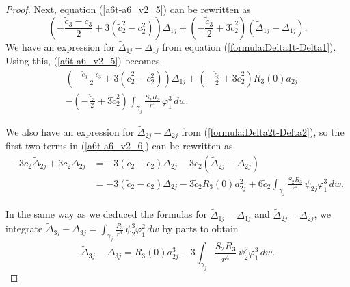 \begin{proof}
Next, equation (\ref{a6t-a6_v2_5}) can be rewritten as
\[ \left(-\frac{\tilde{c}_3-c_3}{2}+3(\tilde{c}_2^2-c_2^2)\right)\Delta_{1j}+\left(-\frac{\tilde{c}_3}{2}+3\tilde{c}_2^2\right)(\widetilde{\Delta}_{1j}-\Delta_{1j}). \]
We have an expression for $\widetilde{\Delta}_{1j}-\Delta_{1j}$ from equation (\ref{formula:Delta1t-Delta1}). Using this, (\ref{a6t-a6_v2_5}) becomes
\begin{align}
& \left(-\frac{\tilde{c}_3-c_3}{2}+3(\tilde{c}_2^2-c_2^2)\right)\Delta_{1j} +\left(-\frac{\tilde{c}_3}{2}+3\tilde{c}_2^2\right)R_3(0)a_{2j} \nonumber \\ 
& -\left(-\frac{\tilde{c}_3}{2}+3\tilde{c}_2^2\right)\int_{\gamma_j}\frac{S_2R_3}{r^4}\,\varphi_1^3\,dw. \label{eq:Delta1t-Delta1}
\end{align}

We also have an expression for $\widetilde{\Delta}_{2j}-\Delta_{2j}$ from (\ref{formula:Delta2t-Delta2}), so the first two terms in (\ref{a6t-a6_v2_6}) can be rewritten as
\begin{align}
 -3\tilde{c}_2\widetilde{\Delta}_{2j}+3c_2\Delta_{2j} &= -3(\tilde{c}_2-c_2)\Delta_{2j}-3\tilde{c}_2(\widetilde{\Delta}_{2j}-\Delta_{2j}) \nonumber \\
 &= -3(\tilde{c}_2-c_2)\Delta_{2j}-3\tilde{c}_2R_3(0)a_{2j}^2+6\tilde{c}_2\int_{\gamma_j}\frac{S_2R_3}{r^4}\,\psi_{2j}\varphi_1^3\,dw. \label{eq:Delta2t-Delta2}
\end{align}

In the same way as we deduced the formulas for $\widetilde{\Delta}_{1j}-\Delta_{1j}$ and $\widetilde{\Delta}_{2j}-\Delta_{2j}$, we integrate $\widetilde{\Delta}_{3j}-\Delta_{3j}=\int_{\gamma_j}\frac{P_3}{r^3}\,\psi_2^3\varphi_1^2\,dw$ by parts to obtain
\begin{equation}\label{eq:Delta3t-Delta3}
 \widetilde{\Delta}_{3j}-\Delta_{3j}=R_3(0)a_{2j}^3-3\int_{\gamma_j}\frac{S_2R_3}{r^4}\,\psi_2^2\varphi_1^3\,dw.
\end{equation}


\end{proof}
